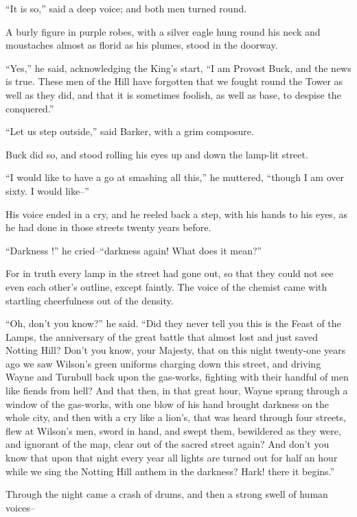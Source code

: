 \documentclass{book}
\begin{document}
“It is so,” said a deep voice; and both men turned round.

A burly figure in purple robes, with a silver eagle hung round his neck and moustaches almost as florid as his plumes, stood in the doorway.

“Yes,” he said, acknowledging the King’s start, “I am Provost Buck, and the news is true. These men of the Hill have forgotten that we fought round the Tower as well as they did, and that it is sometimes foolish, as well as base, to despise the conquered.”

“Let us step outside,” said Barker, with a grim composure.

Buck did so, and stood rolling his eyes up and down the lamp-lit street.

“I would like to have a go at smashing all this,” he muttered, “though I am over sixty. I would like–”

His voice ended in a cry, and he reeled back a step, with his hands to his eyes, as he had done in those streets twenty years before.

“Darkness !” he cried–“darkness again! What does it mean?”

For in truth every lamp in the street had gone out, so that they could not see even each other’s outline, except faintly. The voice of the chemist came with startling cheerfulness out of the density.

“Oh, don’t you know?” he said. “Did they never tell you this is the Feast of the Lamps, the anniversary of the great battle that almost lost and just saved Notting Hill? Don’t you know, your Majesty, that on this night twenty-one years ago we saw Wilson’s green uniforms charging down this street, and driving Wayne and Turnbull back upon the gas-works, fighting with their handful of men like fiends from hell? And that then, in that great hour, Wayne sprang through a window of the gas-works, with one blow of his hand brought darkness on the whole city, and then with a cry like a lion’s, that was heard through four streets, flew at Wilson’s men, sword in hand, and swept them, bewildered as they were, and ignorant of the map, clear out of the sacred street again? And don’t you know that upon that night every year all lights are turned out for half an hour while we sing the Notting Hill anthem in the darkness? Hark! there it begins.”

Through the night came a crash of drums, and then a strong swell of human voices–
\end{document}
